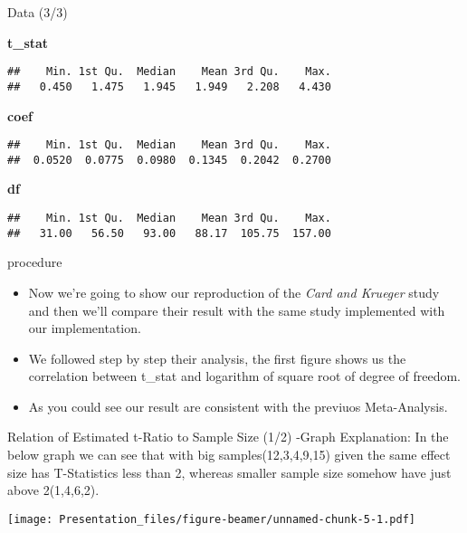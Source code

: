 \documentclass[
  9 pt,
  ignorenonframetext,
]{beamer}
\begin{document}
\begin{frame}[fragile]{Data (3/3)}
\protect\hypertarget{data-33}{}
\begin{block}{\textbf{t\_stat}}
\protect\hypertarget{t_stat}{}
\begin{verbatim}
##    Min. 1st Qu.  Median    Mean 3rd Qu.    Max. 
##   0.450   1.475   1.945   1.949   2.208   4.430
\end{verbatim}
\end{block}

\begin{block}{\textbf{coef}}
\protect\hypertarget{coef}{}
\begin{verbatim}
##    Min. 1st Qu.  Median    Mean 3rd Qu.    Max. 
##  0.0520  0.0775  0.0980  0.1345  0.2042  0.2700
\end{verbatim}
\end{block}

\begin{block}{\textbf{df}}
\protect\hypertarget{df}{}
\begin{verbatim}
##    Min. 1st Qu.  Median    Mean 3rd Qu.    Max. 
##   31.00   56.50   93.00   88.17  105.75  157.00
\end{verbatim}
\end{block}
\end{frame}

\begin{frame}{procedure}
\protect\hypertarget{procedure}{}
\begin{itemize}
\item
  Now we're going to show our reproduction of the \emph{Card and
  Krueger} study and then we'll compare their result with the same study
  implemented with our implementation.
\item
  We followed step by step their analysis, the first figure shows us the
  correlation between t\_stat and logarithm of square root of degree of
  freedom.
\item
  As you could see our result are consistent with the previuos
  Meta-Analysis.
\end{itemize}
\end{frame}

\begin{frame}{Relation of Estimated t-Ratio to Sample Size (1/2)}
\protect\hypertarget{relation-of-estimated-t-ratio-to-sample-size-12}{}
-Graph Explanation: In the below graph we can see that with big
samples(12,3,4,9,15) given the same effect size has T-Statistics less
than 2, whereas smaller sample size somehow have just above 2(1,4,6,2).

\texttt{[image: Presentation\_files/figure-beamer/unnamed-chunk-5-1.pdf]}
\end{frame}
\end{document}
